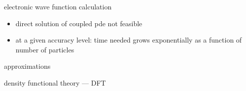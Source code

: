 \documentclass[slovene, usenames,dvipsnames]{beamer}
\begin{document}
  \begin{frame}{electronic wave function calculation}
    \begin{itemize}
    \item direct solution of coupled pde not feasible
    \item at a given accuracy level: time needed grows exponentially as a function
      of number of particles
    \end{itemize}
    \centering approximations
    \begin{minipage}{\textwidth}
    \end{minipage}    
  \end{frame}

  
  \begin{frame}{density functional theory --- DFT}
  \end{frame}
  
\end{document}
